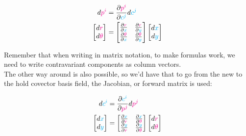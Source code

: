 \begin{align*}
    d\begingroup\color{magenta}p^i\endgroup &= \frac{\partial \begingroup\color{magenta}p^i\endgroup}{\partial \begingroup\color{cyan}c^j\endgroup} d\begingroup\color{cyan}c^j\endgroup\\
    \begin{bmatrix}
        d\begingroup\color{magenta}r\endgroup\\
        d\begingroup\color{magenta}\theta\endgroup
    \end{bmatrix} &= 
    \begin{bmatrix}
        \frac{\partial \begingroup\color{magenta}r\endgroup}{\partial \begingroup\color{cyan}x\endgroup} & \frac{\partial \begingroup\color{magenta}r\endgroup}{\partial \begingroup\color{cyan}y\endgroup}\\
        \frac{\partial \begingroup\color{magenta}\theta\endgroup}{\partial \begingroup\color{cyan}x\endgroup} & \frac{\partial \begingroup\color{magenta}\theta\endgroup}{\partial \begingroup\color{cyan}y\endgroup}
    \end{bmatrix} 
    \begin{bmatrix}
        d\begingroup\color{cyan}x\endgroup\\
        d\begingroup\color{cyan}y\endgroup
    \end{bmatrix}
\end{align*}

Remember that when writing in matrix notation, to make formulas work, we need to write contravariant components as column vectors.\\
The other way around is also possible, so we'd have that to go from the new to the hold covector basis field, the Jacobian, or forward matrix is used:

\begin{align*}
    d\begingroup\color{cyan}c^i\endgroup &= \frac{\partial \begingroup\color{cyan}c^i\endgroup}{\partial \begingroup\color{magenta}p^j\endgroup} d\begingroup\color{magenta}p^j\endgroup\\
    \begin{bmatrix}
        d\begingroup\color{cyan}x\endgroup\\
        d\begingroup\color{cyan}y\endgroup
    \end{bmatrix} &= 
    \begin{bmatrix}
        \frac{\partial \begingroup\color{cyan}x\endgroup}{\partial \begingroup\color{magenta}r\endgroup} & \frac{\partial \begingroup\color{cyan}x\endgroup}{\partial \begingroup\color{magenta}\theta\endgroup}\\
        \frac{\partial \begingroup\color{cyan}y\endgroup}{\partial \begingroup\color{magenta}r\endgroup} & \frac{\partial \begingroup\color{cyan}y\endgroup}{\partial \begingroup\color{magenta}\theta\endgroup}
    \end{bmatrix} 
    \begin{bmatrix}
        d\begingroup\color{magenta}r\endgroup\\
        d\begingroup\color{magenta}\theta\endgroup
    \end{bmatrix}
\end{align*}

